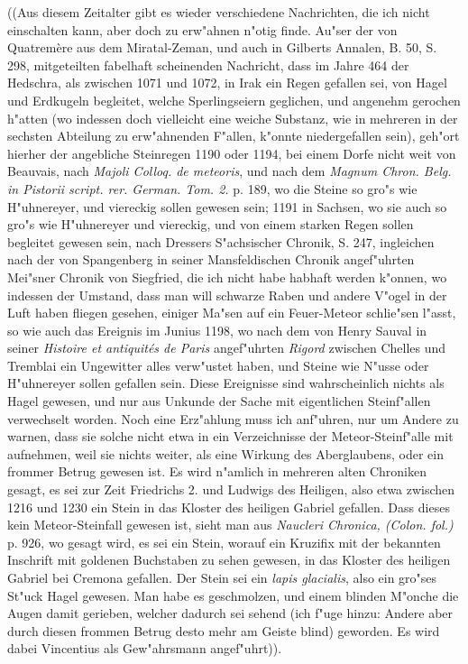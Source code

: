 \documentclass[a4paper, 11pt, oneside, polutonikogreek, german]{article}
\begin{document}
((Aus diesem Zeitalter gibt es wieder verschiedene Nachrichten, die ich nicht einschalten kann, aber doch zu erw"ahnen n"otig finde. Au"ser der von Quatremère aus dem Miratal-Zeman, und auch in Gilberts Annalen, B. 50, S. 298, mitgeteilten fabelhaft scheinenden Nachricht, dass im Jahre 464 der Hedschra, als zwischen 1071 und 1072, in Irak ein Regen gefallen sei, von Hagel und Erdkugeln begleitet, welche Sperlingseiern geglichen, und angenehm gerochen h"atten (wo indessen doch vielleicht eine weiche Substanz, wie in mehreren in der sechsten Abteilung zu erw"ahnenden F"allen, k"onnte niedergefallen sein), geh"ort hierher der angebliche Steinregen 1190 oder 1194, bei einem Dorfe nicht weit von Beauvais, nach \emph{Majoli Colloq. de meteoris}, und nach dem \emph{Magnum Chron. Belg. in Pistorii script. rer. German. Tom. 2.} p. 189, wo die Steine so gro"s wie H"uhnereyer, und viereckig sollen gewesen sein; 1191 in Sachsen, wo sie auch so gro"s wie H"uhnereyer und viereckig, und von einem starken Regen sollen begleitet gewesen sein, nach Dressers S"achsischer Chronik, S. 247, ingleichen nach der von Spangenberg in seiner Mansfeldischen Chronik angef"uhrten Mei"sner Chronik von Siegfried, die ich nicht habe habhaft werden k"onnen, wo indessen der Umstand, dass man will schwarze Raben und andere V"ogel in der Luft haben fliegen gesehen, einiger Ma"sen auf ein Feuer-Meteor schlie"sen l"asst, so wie auch das Ereignis im Junius 1198, wo nach dem von Henry Sauval in seiner \emph{Histoire et antiquités de Paris} angef"uhrten \emph{Rigord} zwischen Chelles und Tremblai ein Ungewitter alles verw"ustet haben, und Steine wie N"usse oder H"uhnereyer sollen gefallen sein. Diese Ereignisse sind wahrscheinlich nichts als Hagel gewesen, und nur aus Unkunde der Sache mit eigentlichen Steinf"allen verwechselt worden. Noch eine Erz"ahlung muss ich anf"uhren, nur um Andere zu warnen, dass sie solche nicht etwa in ein Verzeichnisse der Meteor-Steinf"alle mit aufnehmen, weil sie nichts weiter, als eine Wirkung des Aberglaubens, oder ein frommer Betrug gewesen ist. Es wird n"amlich in mehreren alten Chroniken gesagt, es sei zur Zeit Friedrichs 2. und Ludwigs des Heiligen, also etwa zwischen 1216 und 1230 ein Stein in das Kloster des heiligen Gabriel gefallen. Dass dieses kein Meteor-Steinfall gewesen ist, sieht man aus \emph{Naucleri Chronica, (Colon. fol.)} p. 926, wo gesagt wird, es sei ein Stein, worauf ein Kruzifix mit der bekannten Inschrift mit goldenen Buchstaben zu sehen gewesen, in das Kloster des heiligen Gabriel bei Cremona gefallen. Der Stein sei ein \emph{lapis glacialis}, also ein gro"ses St"uck Hagel gewesen. Man habe es geschmolzen, und einem blinden M"onche die Augen damit gerieben, welcher dadurch sei sehend (ich f"uge hinzu: Andere aber durch diesen frommen Betrug desto mehr am Geiste blind) geworden. Es wird dabei Vincentius als Gew"ahrsmann angef"uhrt)).
\end{document}
